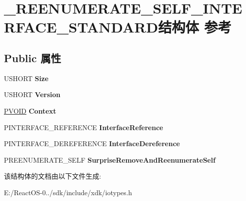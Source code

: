 \hypertarget{struct___r_e_e_n_u_m_e_r_a_t_e___s_e_l_f___i_n_t_e_r_f_a_c_e___s_t_a_n_d_a_r_d}{}\section{\+\_\+\+R\+E\+E\+N\+U\+M\+E\+R\+A\+T\+E\+\_\+\+S\+E\+L\+F\+\_\+\+I\+N\+T\+E\+R\+F\+A\+C\+E\+\_\+\+S\+T\+A\+N\+D\+A\+R\+D结构体 参考}
\label{struct___r_e_e_n_u_m_e_r_a_t_e___s_e_l_f___i_n_t_e_r_f_a_c_e___s_t_a_n_d_a_r_d}
\subsection*{Public 属性}
\begin{DoxyCompactItemize}
\item 
\mbox{\label{struct___r_e_e_n_u_m_e_r_a_t_e___s_e_l_f___i_n_t_e_r_f_a_c_e___s_t_a_n_d_a_r_d_a24351b26a6464c0fcd8ab0e3d51046ab}} 
U\+S\+H\+O\+RT {\bfseries Size}
\item 
\mbox{\label{struct___r_e_e_n_u_m_e_r_a_t_e___s_e_l_f___i_n_t_e_r_f_a_c_e___s_t_a_n_d_a_r_d_a302933639e4c48b00d3a3bddea29a09f}} 
U\+S\+H\+O\+RT {\bfseries Version}
\item 
\mbox{\label{struct___r_e_e_n_u_m_e_r_a_t_e___s_e_l_f___i_n_t_e_r_f_a_c_e___s_t_a_n_d_a_r_d_a8fb0646b92b8eb7c87390d9421bb6ede}} 
\hyperlink{interfacevoid}{P\+V\+O\+ID} {\bfseries Context}
\item 
\mbox{\label{struct___r_e_e_n_u_m_e_r_a_t_e___s_e_l_f___i_n_t_e_r_f_a_c_e___s_t_a_n_d_a_r_d_a0fa341c3e0d2db2bb58494d175d4b269}} 
P\+I\+N\+T\+E\+R\+F\+A\+C\+E\+\_\+\+R\+E\+F\+E\+R\+E\+N\+CE {\bfseries Interface\+Reference}
\item 
\mbox{\label{struct___r_e_e_n_u_m_e_r_a_t_e___s_e_l_f___i_n_t_e_r_f_a_c_e___s_t_a_n_d_a_r_d_aba03fd3f2a06f25f95c5f05a829bafec}} 
P\+I\+N\+T\+E\+R\+F\+A\+C\+E\+\_\+\+D\+E\+R\+E\+F\+E\+R\+E\+N\+CE {\bfseries Interface\+Dereference}
\item 
\mbox{\label{struct___r_e_e_n_u_m_e_r_a_t_e___s_e_l_f___i_n_t_e_r_f_a_c_e___s_t_a_n_d_a_r_d_a09c40fd50faa7999123f1fdc6493fe9a}} 
P\+R\+E\+E\+N\+U\+M\+E\+R\+A\+T\+E\+\_\+\+S\+E\+LF {\bfseries Surprise\+Remove\+And\+Reenumerate\+Self}
\end{DoxyCompactItemize}


该结构体的文档由以下文件生成\+:\begin{DoxyCompactItemize}
\item 
E\+:/\+React\+O\+S-\/0../sdk/include/xdk/iotypes.\+h\end{DoxyCompactItemize}
